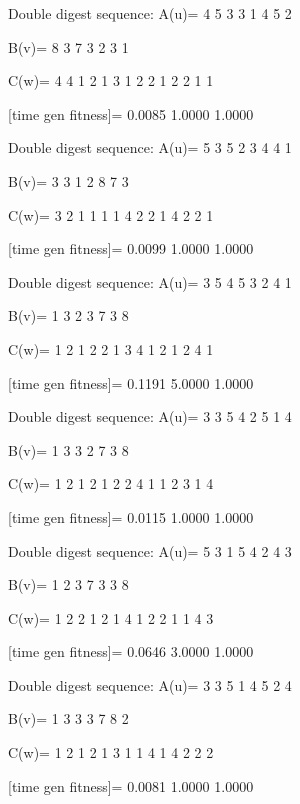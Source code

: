 Double digest sequence:
A(u)=
     4     5     3     3     1     4     5     2

B(v)=
     8     3     7     3     2     3     1

C(w)=
     4     4     1     2     1     3     1     2     2     1     2     2     1     1

[time gen fitness]=
    0.0085    1.0000    1.0000

Double digest sequence:
A(u)=
     5     3     5     2     3     4     4     1

B(v)=
     3     3     1     2     8     7     3

C(w)=
     3     2     1     1     1     1     4     2     2     1     4     2     2     1

[time gen fitness]=
    0.0099    1.0000    1.0000

Double digest sequence:
A(u)=
     3     5     4     5     3     2     4     1

B(v)=
     1     3     2     3     7     3     8

C(w)=
     1     2     1     2     2     1     3     4     1     2     1     2     4     1

[time gen fitness]=
    0.1191    5.0000    1.0000

Double digest sequence:
A(u)=
     3     3     5     4     2     5     1     4

B(v)=
     1     3     3     2     7     3     8

C(w)=
     1     2     1     2     1     2     2     4     1     1     2     3     1     4

[time gen fitness]=
    0.0115    1.0000    1.0000

Double digest sequence:
A(u)=
     5     3     1     5     4     2     4     3

B(v)=
     1     2     3     7     3     3     8

C(w)=
     1     2     2     1     2     1     4     1     2     2     1     1     4     3

[time gen fitness]=
    0.0646    3.0000    1.0000

Double digest sequence:
A(u)=
     3     3     5     1     4     5     2     4

B(v)=
     1     3     3     3     7     8     2

C(w)=
     1     2     1     2     1     3     1     1     4     1     4     2     2     2

[time gen fitness]=
    0.0081    1.0000    1.0000

